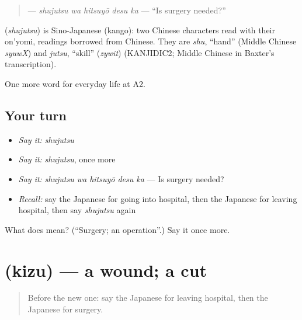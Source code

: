 \begin{quote}
\textbf{ } — \emph{shujutsu wa hitsuyō desu ka} — \textquotedblleft{}Is surgery needed?\textquotedblright{}
\end{quote}

\begin{cousinweb}
\textbf{} (\emph{shujutsu}) is Sino-Japanese (kango): two Chinese characters read with their on'yomi, readings borrowed from Chinese. They are \emph{shu}, \textquotedblleft{}hand\textquotedblright{} (Middle Chinese \emph{syuwX}) and \emph{jutsu}, \textquotedblleft{}skill\textquotedblright{} (\emph{zywit}) (KANJIDIC2; Middle Chinese in Baxter's transcription).
\end{cousinweb}

\begin{grammarlens}[title={What you've built}]
One more word for everyday life at A2.
\end{grammarlens}

\subsection*{Your turn}
\begin{itemize}
\raggedright
  \item \emph{Say it:} \emph{shujutsu}
  \item \emph{Say it:} \emph{shujutsu}, once more
  \item \emph{Say it:} \emph{shujutsu wa hitsuyō desu ka} — Is surgery needed?
  \item \emph{Recall:} say the Japanese for going into hospital, then the Japanese for leaving hospital, then say \emph{shujutsu} again
\end{itemize}

\begin{tcolorbox}[breakable,colback=teal!4,colframe=teal!35!black,title={Before you move on}]
What does  mean? (\textquotedblleft{}Surgery; an operation\textquotedblright{}.) Say it once more.
\end{tcolorbox}
\section[\texorpdfstring{\ja{きず} (kizu)}{きず (kizu)}]{ (kizu) — a wound; a cut}

\label{lesson:JA-C218-kizu}



\begin{quote}
Before the new one: say the Japanese for leaving hospital, then the Japanese for surgery.
\end{quote}

